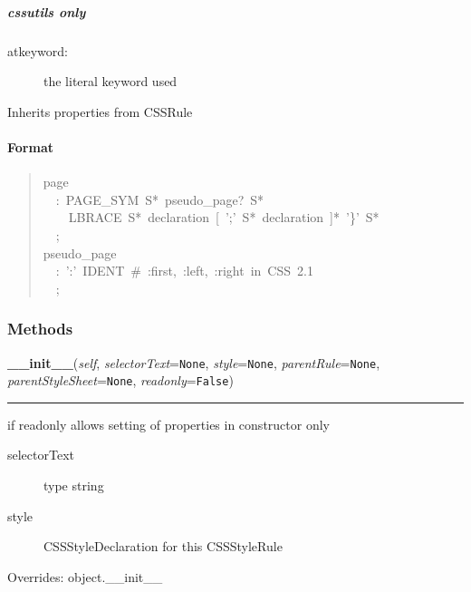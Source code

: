 \hypertarget{cssutils-only}{}
\subparagraph*{cssutils only}
\label{cssutils-only}
\begin{description}
\item[{atkeyword:}] \leavevmode 
the literal keyword used

\end{description}

Inherits properties from CSSRule



\hypertarget{format}{}
\paragraph*{Format}
\label{format}
\begin{quote}{\ttfamily \raggedright \noindent
page~\\
~~:~PAGE{\_}SYM~S*~pseudo{\_}page?~S*~\\
~~~~LBRACE~S*~declaration~{[}~';'~S*~declaration~{]}*~'{\}}'~S*~\\
~~;~\\
pseudo{\_}page~\\
~~:~':'~IDENT~{\#}~:first,~:left,~:right~in~CSS~2.1~\\
~~;
}\end{quote}


  \subsubsection{Methods}

    \vspace{0.5ex}

\hspace{.8\funcindent}\begin{boxedminipage}{\funcwidth}

    \raggedright \textbf{\_\_init\_\_}(\textit{self}, \textit{selectorText}={\tt None}, \textit{style}={\tt None}, \textit{parentRule}={\tt None}, \textit{parentStyleSheet}={\tt None}, \textit{readonly}={\tt False})

    \vspace{-1.5ex}

    \rule{\textwidth}{0.5\fboxrule}
\setlength{\parskip}{2ex}

if readonly allows setting of properties in constructor only
\begin{description}
\item[{selectorText}] \leavevmode 
type string

\item[{style}] \leavevmode 
CSSStyleDeclaration for this CSSStyleRule

\end{description}
\setlength{\parskip}{1ex}
      Overrides: object.\_\_init\_\_

    \end{boxedminipage}

